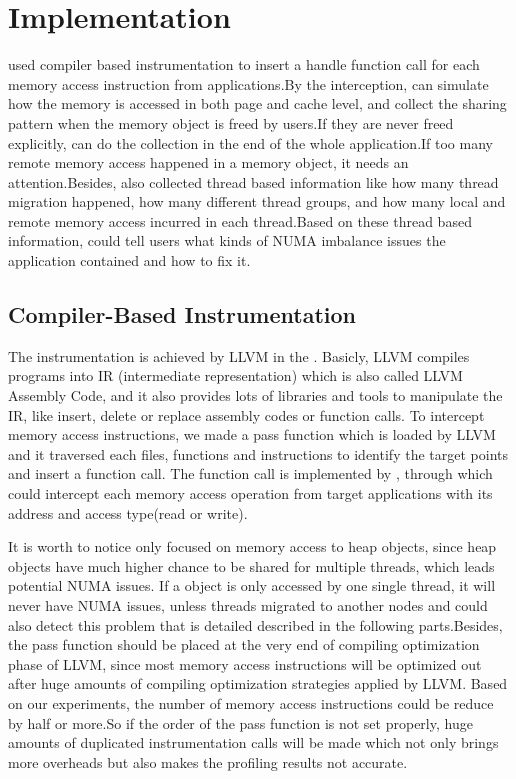 \section{Implementation}

\NP{} used compiler based instrumentation to insert a handle function call for each memory access instruction from applications.By the interception, \NP{} can simulate how the memory is accessed in both page and cache level, and collect the sharing pattern when the memory object is freed by users.If they are never freed explicitly, \NP{} can do the collection in the end of the whole application.If too many remote memory access happened in a memory object, it needs an attention.Besides, \NP{} also collected thread based information like how many thread migration happened, how many different thread groups, and how many local and remote memory access incurred in each thread.Based on these thread based information, \NP{} could tell users what kinds of NUMA imbalance issues the application contained and how to fix it.
\subsection{Compiler-Based Instrumentation} 
The instrumentation is achieved by LLVM in the \NP{}. Basicly, LLVM compiles programs into IR (intermediate representation) which is also called LLVM Assembly Code, and it also provides lots of libraries and tools to manipulate the IR, like insert, delete or replace assembly codes or function calls.
To intercept memory access instructions, we made a pass function which is loaded by LLVM and it traversed each files, functions and instructions to identify the target points and insert a function call. The function call is implemented by \NP{}, through which \NP{} could intercept each memory access operation from target applications with its address and access type(read or write).

It is worth to notice \NP{} only focused on memory access to heap objects, since heap objects have much higher chance to be shared for multiple threads, which leads potential NUMA issues. If a object is only accessed by one single thread, it will never have NUMA issues, unless threads migrated to another nodes and \NP{} could also detect this problem that is detailed described in the following parts.Besides, the pass function should be placed at the very end of compiling optimization phase of LLVM, since most memory access instructions will be optimized out after huge amounts of compiling optimization strategies applied by LLVM. Based on our experiments, the number of memory access instructions could be reduce by half or more.So if the order of the pass function is not set properly, huge amounts of duplicated instrumentation calls will be made which not only brings more overheads but also makes the profiling results not accurate.

